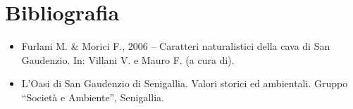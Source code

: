 \section*{Bibliografia}
\begin{itemize}\itemsep0pt
	\item Furlani M. \& Morici F., 2006 -- Caratteri naturalistici della cava di
San Gaudenzio. In: Villani V. e Mauro F. (a cura di).
	\item L{\textquoteright}Oasi di San Gaudenzio di Senigallia. Valori storici
ed ambientali. Gruppo {\textquotedblleft}Societ\`a e
Ambiente{\textquotedblright}, Senigallia.
\end{itemize}

